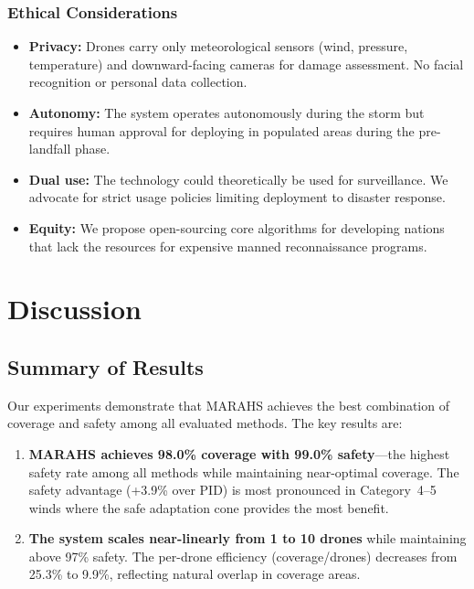 \documentclass[12pt,a4paper,twocolumn]{article}
\begin{document}
\begin{enumerate}[leftmargin=*]
\subsubsection{Ethical Considerations}
\begin{itemize}[leftmargin=*]
    \item \textbf{Privacy:} Drones carry only meteorological sensors (wind, pressure, temperature) and downward-facing cameras for damage assessment. No facial recognition or personal data collection.
    \item \textbf{Autonomy:} The system operates autonomously during the storm but requires human approval for deploying in populated areas during the pre-landfall phase.
    \item \textbf{Dual use:} The technology could theoretically be used for surveillance. We advocate for strict usage policies limiting deployment to disaster response.
    \item \textbf{Equity:} We propose open-sourcing core algorithms for developing nations that lack the resources for expensive manned reconnaissance programs.
\end{itemize}


\section{Discussion}
\label{sec:discussion}

\subsection{Summary of Results}
\label{sec:results_summary}

Our experiments demonstrate that MARAHS achieves the best combination of coverage and safety among all evaluated methods. The key results are:

\begin{enumerate}[leftmargin=*]
    \item \textbf{MARAHS achieves 98.0\% coverage with 99.0\% safety}---the highest safety rate among all methods while maintaining near-optimal coverage. The safety advantage (+3.9\% over PID) is most pronounced in Category~4--5 winds where the safe adaptation cone provides the most benefit.

    \item \textbf{The system scales near-linearly from 1 to 10 drones} while maintaining above 97\% safety. The per-drone efficiency (coverage/drones) decreases from 25.3\% to 9.9\%, reflecting natural overlap in coverage areas.


\end{enumerate}
\end{enumerate}
\end{document}
